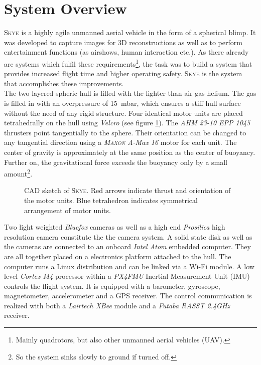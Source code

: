 \section{System Overview}
\label{sec:system overview}
\textsc{Skye} is a highly agile unmanned aerial vehicle in the form of a spherical blimp. It was developed to capture images for 3D reconstructions as well as to perform entertainment functions (as airshows, human interaction etc.). As there already are systems which fulfil these requirements\footnote{Mainly quadrotors, but also other unmanned aerial vehicles (UAV).}, the task was to build a system that provides increased flight time and higher operating safety. \textsc{Skye} is the system that accomplishes these improvements. \\
The two-layered spheric hull is filled with the lighter-than-air gas helium. The gas is filled in with an overpressure of \SI{15}{\milli\bar}, which ensures a stiff hull surface without the need of any rigid structure. Four identical motor units are placed tetrahedrally on the hull using \textit{Velcro} (see figure \ref{fig:skye_description}). The \textit{AHM 23-10 EPP 1045} thrusters point tangentially to the sphere. Their orientation can be changed to any tangential direction using a \textit{\textsc{Maxon} A-Max 16} motor for each unit. The center of gravity is approximately at the same position as the center of buoyancy. Further on, the gravitational force exceeds the buoyancy only by a small amount\footnote{So the system sinks slowly to ground if turned off.}.
\begin{figure}[H]
    \centering
    \def\svgwidth{0.8\columnwidth}
    
    \caption{CAD sketch of \textsc{Skye}. Red arrows indicate thrust and orientation of the motor units. Blue tetrahedron indicates symmetrical arrangement of motor units. }
    \label{fig:skye_description}
\end{figure}
Two light weighted \textit{Bluefox} cameras as well as a high end \textit{Prosilica} high resolution camera constitute the the camera system. A solid state disk as well as the cameras are connected to an onboard \textit{Intel Atom} embedded computer. They are all together placed on a electronics platform attached to the hull. The computer runs a Linux distribution and can be linked via a Wi-Fi module. A low level \textit{Cortex M4} processor within a \textit{PX4FMU} Inertial Measurement Unit (IMU) controls the flight system. It is equipped with a barometer, gyroscope, magnetometer, accelerometer and a GPS receiver. The control communication is realized with both a \textit{Lairtech XBee} module and a \textit{Futaba RASST 2.4GHz} receiver. \\
